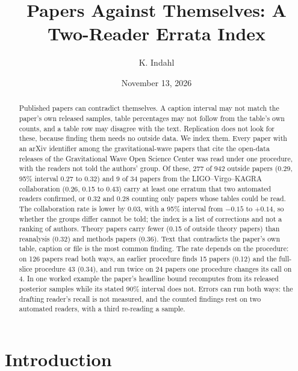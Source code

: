 \documentclass[reprint,amsmath,amssymb,aps,superscriptaddress,nofootinbib]{revtex4-2}
\begin{document}
\title{Papers Against Themselves: A Two-Reader Errata Index}

\author{K. Indahl}

\date{November 13, 2026}

\begin{abstract}
Published papers can contradict themselves. A caption interval may not match the paper's own released samples, table percentages may not follow from the table's own counts, and a table row may disagree with the text. Replication does not look for these, because finding them needs no outside data. We index them. Every paper with an arXiv identifier among the gravitational-wave papers that cite the open-data releases of the Gravitational Wave Open Science Center was read under one procedure, with the readers not told the authors' group. Of these, 277 of 942 outside papers (0.29, 95\% interval 0.27 to 0.32) and 9 of 34 papers from the LIGO--Virgo--KAGRA collaboration (0.26, 0.15 to 0.43) carry at least one erratum that two automated readers confirmed, or 0.32 and 0.28 counting only papers whose tables could be read. The collaboration rate is lower by 0.03, with a 95\% interval from $-0.15$ to $+0.14$, so whether the groups differ cannot be told; the index is a list of corrections and not a ranking of authors. Theory papers carry fewer (0.15 of outside theory papers) than reanalysis (0.32) and methods papers (0.36). Text that contradicts the paper's own table, caption or file is the most common finding. The rate depends on the procedure: on 126 papers read both ways, an earlier procedure finds 15 papers (0.12) and the full-slice procedure 43 (0.34), and run twice on 24 papers one procedure changes its call on 4. In one worked example the paper's headline bound recomputes from its released posterior samples while its stated 90\% interval does not. Errors can run both ways: the drafting reader's recall is not measured, and the counted findings rest on two automated readers, with a third re-reading a sample.
\end{abstract}

\maketitle

\section{Introduction}
\end{document}
